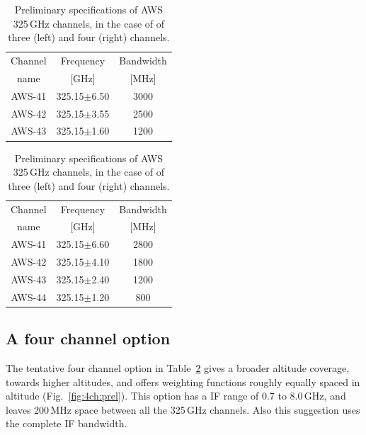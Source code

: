 \documentclass[12pt]{article}
\begin{document}
\begin{table}[!t]
  \begin{minipage}[b]{0.5\linewidth}
  \centering  
  \begin{tabular}[c]{c|c|c}
    Channel & Frequency   & Bandwidth \\
    name    & [GHz] &  [MHz] \\
    \hline
    AWS-41  & 325.15$\pm$6.50 & 3000\\
    AWS-42  & 325.15$\pm$3.55 & 2500\\
    AWS-43  & 325.15$\pm$1.60 & 1200\\
    \hline
  \end{tabular}
  \end{minipage}%
  \begin{minipage}[b]{0.5\linewidth}
  \centering  
  \begin{tabular}[c]{c|c|c}
    Channel & Frequency   & Bandwidth \\
    name    & [GHz] &  [MHz] \\
    \hline
    AWS-41  & 325.15$\pm$6.60 & 2800\\
    AWS-42  & 325.15$\pm$4.10 & 1800\\
    AWS-43  & 325.15$\pm$2.40 & 1200\\
    AWS-44  & 325.15$\pm$1.20 & \phantom{0}800\\
    \hline
  \end{tabular}
  \end{minipage}  
  \caption{Preliminary specifications of AWS 325\,GHz channels, in the case of
    of three (left) and four (right) channels.}
  \label{tab:chs:prel}
\end{table}


\subsection{A four channel option}
%
The tentative four channel option in Table~\ref{tab:chs:prel} gives a broader
altitude coverage, towards higher altitudes, and offers weighting functions
roughly equally spaced in altitude (Fig.~\ref {fig:4ch:prel}). This option has
a IF range of 0.7 to 8.0\,GHz, and leaves 200\,MHz space between all the
325\,GHz channels. Also this suggestion uses the complete IF bandwidth.
\end{document}
